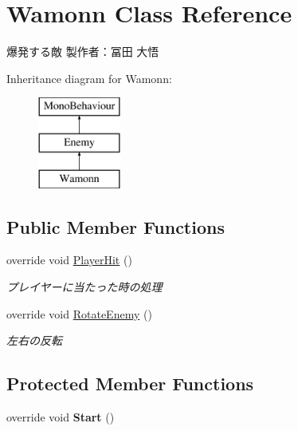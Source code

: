 \hypertarget{class_wamonn}{}\section{Wamonn Class Reference}
\label{class_wamonn}


爆発する敵 製作者：冨田 大悟  


Inheritance diagram for Wamonn\+:\begin{figure}[H]
\begin{center}
\leavevmode
\includegraphics[height=3.000000cm]{class_wamonn}
\end{center}
\end{figure}
\subsection*{Public Member Functions}
\begin{DoxyCompactItemize}
\item 
override void \hyperlink{class_wamonn_a46080369edebc97e39e1841b91258856}{Player\+Hit} ()
\begin{DoxyCompactList}\small\item\em プレイヤーに当たった時の処理 \end{DoxyCompactList}\item 
override void \hyperlink{class_wamonn_a84f3f9f2380c28a7e455f0cee6e9c933}{Rotate\+Enemy} ()
\begin{DoxyCompactList}\small\item\em 左右の反転 \end{DoxyCompactList}\end{DoxyCompactItemize}
\subsection*{Protected Member Functions}
\begin{DoxyCompactItemize}
\item 
\mbox{\label{class_wamonn_a740973b7d8416eac87240bc11670d3c6}} 
override void {\bfseries Start} ()
\end{DoxyCompactItemize}
